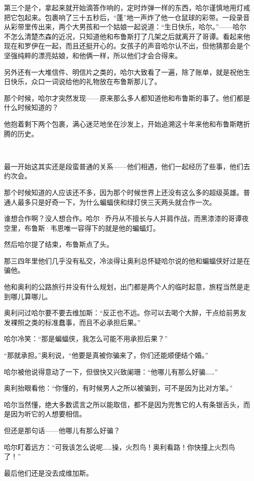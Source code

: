 \documentclass[../main]{subfiles}
\begin{document}
第三个是个，拿起来就开始滴答作响的，定时炸弹一样的东西，哈尔谨慎地用灯戒把它包起来。包裹响了三十五秒后，“蓬”地一声炸了他一仓鼠球的彩带。一段录音从彩带里传出来，两个大男孩和一个姑娘一起说道：“生日快乐，哈尔。”——哈尔不怎么清楚杰森的近况，只知道他和布鲁斯打了几架之后就离开了哥谭。看起来他现在和罗伊在一起，而且还挺开心的。女孩子的声音哈尔认不出，但他猜那会是个坚强纯粹的漂亮姑娘，和他俩一样，所以他们才会合得来。

另外还有一大堆信件、明信片之类的，哈尔大致看了一遍，除了账单，就是祝他生日快乐，众口一词说给他的礼物放在布鲁斯那儿了。

那个时候，哈尔才突然发现——原来那么多人都知道他和布鲁斯的事了。他们都是什么时候知道的？

他抱着剩下两个包裹，满心迷茫地坐在沙发上，开始追溯这十年来他和布鲁斯瞎折腾的历史。

~\

最一开始这其实还是段蛮普通的关系——他们相遇，他们一起经历了些事，他们去约次会。

那个时候知道的人应该还不多，因为那个时候世界上还没有这么多的超级英雄。普通人最多只是好奇一下，为什么蝙蝠侠和绿灯侠三天两头就合作一次。

谁想合作啊？没人想合作。哈尔·乔丹从不擅长与人并肩作战，而黑漆漆的哥谭夜空里，布鲁斯·韦恩唯一容得下的就是他的蝙蝠灯。

然后哈尔提了结束，布鲁斯点了头。

那三四年里他们几乎没有私交，冷淡得让奥利总怀疑哈尔说的他和蝙蝠侠好过是在骗他。

他和奥利的公路旅行并没有什么规划，出门都是两个人的临时起意，旅程当然是走到哪儿算哪儿。

奥利问过哈尔要不要去维加斯：“反正也不远。你可以去喝个大醉，干点给前男友发裸照之类的标准蠢事，而且不必承担后果。”

哈尔冷笑：“那是蝙蝠侠，我怎么可能不用承担后果？”

“那就承担。”奥利说，“他要是真被你骗来了，你们还能顺便结个婚。”

哈尔被他说得意动了一下，但很快又兴致阑珊：“他哪儿有那么好骗……”

奥利抬眼看他：“你懂的，有时候男人之所以被骗到，可不是因为比对方笨。”

哈尔当然懂，绝大多数谎言之所以能取信，都不是因为兜售它的人有条银舌头，而是因为听它的人想要相信。

但还是那句话——他哪儿有那么好骗？

哈尔盯着远方：“可我该怎么说呢……操，火烈鸟！奥利看路！你快撞上火烈鸟了！”

最后他们还是没去成维加斯。
\end{document}
